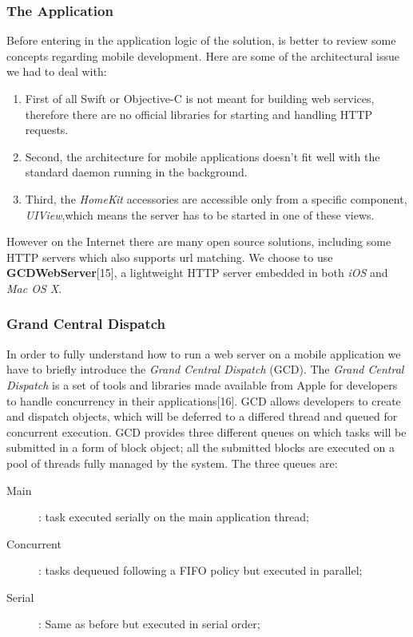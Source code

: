 \subsubsection{The Application}

Before entering in the application logic of the solution, is better to review
some concepts regarding mobile development. Here are some of the architectural
issue we had to deal with:


\begin{enumerate}
    \item First of all Swift or Objective-C is not
    meant for building web services, therefore there are no official libraries for
    starting and handling HTTP requests.
    \item Second, the architecture for mobile applications
    doesn't fit well with the standard daemon running in the background.
    \item Third, the \textit{HomeKit} accessories are accessible only from a
    specific component, \textit{UIView},which means the server has to be started
    in one of these views.
\end{enumerate}

However on the Internet there are many open source solutions, including some HTTP
servers which also supports url matching. We choose to use \textbf{GCDWebServer}[15], a lightweight
HTTP server embedded in both \textit{iOS} and \textit{Mac OS X}.

\subsubsection{Grand Central Dispatch}

In order to fully understand how to run a web server on a mobile application we
have to briefly introduce the \textit{Grand Central Dispatch} (GCD).
The \textit{Grand Central Dispatch} is a set of tools and libraries made available from
Apple for developers to handle concurrency in their applications[16]. GCD allows
developers to create and dispatch objects, which will be deferred to a differed thread
and queued for concurrent execution.\newline
GCD provides three different queues on which tasks will be submitted in a form of block object;
all the submitted blocks are executed on a pool of threads fully managed by the system. The three
queues are:%

\begin{description}
    \item[Main]: task executed serially on the main application thread;
    \item[Concurrent]: tasks dequeued following a FIFO policy but executed in parallel;
    \item[Serial]: Same as before but executed in serial order;
\end{description}

